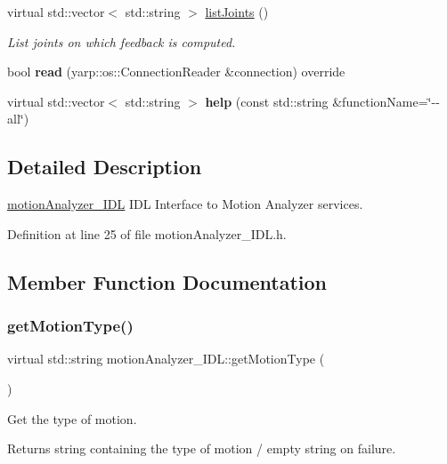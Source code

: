 \begin{DoxyCompactItemize}
virtual std\+::vector$<$ std\+::string $>$ \mbox{\hyperlink{classmotionAnalyzer__IDL_aaec274413bf24d3e213ce6cfb2592748}{list\+Joints}} ()
\begin{DoxyCompactList}\small\item\em List joints on which feedback is computed. \end{DoxyCompactList}\item 
\mbox{\label{classmotionAnalyzer__IDL_a155c67538af54a6f3ec82381b921a159}} 
bool {\bfseries read} (yarp\+::os\+::\+Connection\+Reader \&connection) override
\item 
\mbox{\label{classmotionAnalyzer__IDL_a11954460905060e7f9d7ec2a287cee72}} 
virtual std\+::vector$<$ std\+::string $>$ {\bfseries help} (const std\+::string \&function\+Name=\char`\"{}-\/-\/all\char`\"{})
\end{DoxyCompactItemize}


\subsection{Detailed Description}
\mbox{\hyperlink{classmotionAnalyzer__IDL}{motion\+Analyzer\+\_\+\+I\+DL}} I\+DL Interface to Motion Analyzer services. 

Definition at line 25 of file motion\+Analyzer\+\_\+\+I\+D\+L.\+h.



\subsection{Member Function Documentation}
\mbox{\label{classmotionAnalyzer__IDL_ae7b5e18ee6dae046bab1ed59fb9742e4}} 
\subsubsection{\texorpdfstring{getMotionType()}{getMotionType()}}
{\footnotesize\ttfamily virtual std\+::string motion\+Analyzer\+\_\+\+I\+D\+L\+::get\+Motion\+Type (\begin{DoxyParamCaption}{ }\end{DoxyParamCaption})\hspace{0.3cm}{\ttfamily [virtual]}}



Get the type of motion. 

\begin{DoxyReturn}{Returns}
string containing the type of motion / empty string on failure. 
\end{DoxyReturn}
\mbox{\label{classmotionAnalyzer__IDL_aaec274413bf24d3e213ce6cfb2592748}} 
